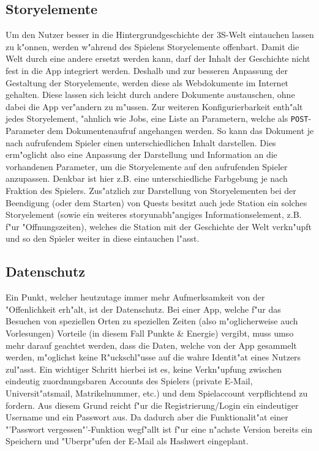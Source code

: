 \documentclass{article}
\begin{document}
\subsection{Storyelemente}
\label{subsec:storyelemente}
Um den Nutzer besser in die Hintergrundgeschichte der 3S-Welt eintauchen lassen zu k"onnen, werden w"ahrend des Spielens Storyelemente offenbart. Damit die Welt durch eine andere ersetzt werden kann, darf der Inhalt der Geschichte nicht fest in die App integriert werden. Deshalb und zur besseren Anpassung der Gestaltung der Storyelemente, werden diese als Webdokumente im Internet gehalten. Diese lassen sich leicht durch andere Dokumente austauschen, ohne dabei die App ver"andern zu m"ussen. Zur weiteren Konfigurierbarkeit enth"alt jedes Storyelement, "ahnlich wie Jobs, eine Liste an Parametern, welche als \texttt{POST}-Parameter dem Dokumentenaufruf angehangen werden. So kann das Dokument je nach aufrufendem Spieler einen unterschiedlichen Inhalt darstellen. Dies erm"oglicht also eine Anpassung der Darstellung und Information an die vorhandenen Parameter, um die Storyelemente auf den aufrufenden Spieler anzupassen. Denkbar ist hier z.B. eine unterschiedliche Farbgebung je nach Fraktion des Spielers. Zus"atzlich zur Darstellung von Storyelementen bei der Beendigung (oder dem Starten) von Quests besitzt auch jede Station ein solches Storyelement (sowie ein weiteres storyunabh"angiges Informationselement, z.B. f"ur "Offnungszeiten), welches die Station mit der Geschichte der Welt verkn"upft und so den Spieler weiter in diese eintauchen l"asst.

\subsection{Datenschutz}
\label{subsec:Datenschutz}
Ein Punkt, welcher heutzutage immer mehr Aufmerksamkeit von der "Offenlichkeit erh"alt, ist der Datenschutz. Bei einer App, welche f"ur das Besuchen von speziellen Orten zu speziellen Zeiten (also m"oglicherweise auch Vorlesungen) Vorteile (in diesem Fall Punkte \& Energie) vergibt, muss umso mehr darauf geachtet werden, dass die Daten, welche von der App gesammelt werden, m"oglichst keine R"uckschl"usse auf die wahre Identit"at eines Nutzers zul"asst. Ein wichtiger Schritt hierbei ist es, keine Verkn"upfung zwischen eindeutig zuordnungsbaren Accounts des Spielers (private E-Mail, Universit"atsmail, Matrikelnummer, etc.) und dem Spielaccount verpflichtend zu fordern. Aus diesem Grund reicht f"ur die Registrierung/Login ein eindeutiger Username und ein Passwort aus. Da dadurch aber die Funktionalit"at einer "'Passwort vergessen"'-Funktion wegf"allt ist f"ur eine n"achste Version bereits ein Speichern und "Uberpr"ufen der E-Mail als Hashwert eingeplant.
\end{document}
